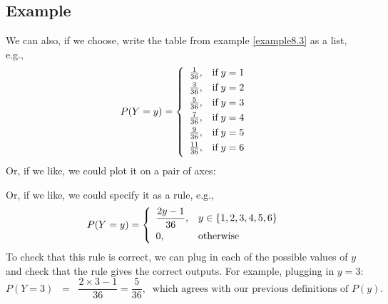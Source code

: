 \subsection{Example} \label{example8.11}
We can also, if we choose, write the table from example \ref{example8.3} as a list, e.g.,
\[
P(Y = y) = \left\{
  \begin{array}{ll}
    \frac{1}{36},   &\text{if} \; y = 1 \smallskip \\
    \frac{3}{36},   &\text{if} \; y = 2 \smallskip \\
    \frac{5}{36},   &\text{if} \; y = 3 \smallskip \\
    \frac{7}{36},   &\text{if} \; y = 4 \smallskip \\
    \frac{9}{36},   &\text{if} \; y = 5 \smallskip \\
    \frac{11}{36}, &\text{if} \; y = 6 \smallskip \\
  \end{array}
\right.
\]
Or, if we like, we could plot it on a pair of axes:
\begin{center}
\end{center}
Or, if we like, we could specify it as a rule, e.g.,
\[
\scases{P(Y = y)}{\displaystyle{\frac{2y-1}{36}}}{y \in \set{1,2,3,4,5,6}}{0}{\text{otherwise}}
\]
To check that this rule is correct, we can plug in each of the possible values of $y$ and check that the rule gives the correct outputs. For example, plugging in $y = 3$: 
\[
P(Y = 3) \;\; = \;\; \frac{2\times3-1}{36} = \frac{5}{36}, \;\; \text{which agrees with our previous definitions of $P(y)$.}
\]

